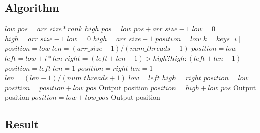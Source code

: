 \documentclass{article}
\begin{document}
\subsection{Algorithm}
\begin{algorithmic}[1]
 \label{alg:p3}
\State $low\_pos = arr\_size * rank$
\State $high\_pos = low\_pos + arr\_size - 1$
\State $low = 0$
\State $high = arr\_size - 1$
\State $low = 0$
\State $high = arr\_size - 1$
\State $position=low$
\State $k = keys[i]$
\State $position = low$
\EndIf
\EndParFor
\Else
\State $len = (arr\_size - 1)/(num\_threads + 1)$
\State $position = low$
\State $left = low + i * len$
\State $right = (left + len - 1) > high ? high : (left + len - 1)$
\State $position=left$
\State $len = 1$
\State $position=right$
\State $len=1$
\Else
{}
\State $len=(len-1)/(num\_threads + 1)$
\State $low = left$
\State $high = right$
\State $position = low$
\EndIf
\EndIf
\EndParFor
\EndWhile
\EndIf
\State $position=position+low\_pos$
\State Output position
\State $position = high + low\_pos$
\State Output position
\Else
{}
\State $position = low + low\_pos$
\State Output position
\EndIf
\EndIf
\EndFor
\EndFunction
\end{algorithmic}
\subsection{Result}
\end{document}
